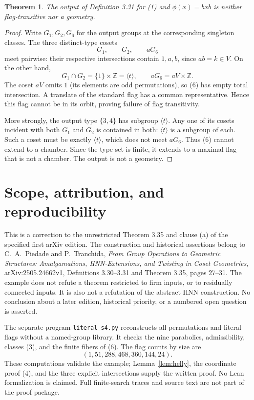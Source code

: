 \documentclass[11pt,a4paper]{article}
\newtheorem{theorem}{Theorem}
\newcommand{\gen}[1]{\langle #1\rangle}
\begin{document}
\begin{theorem}
The output of Definition 3.31 for (1) and $\phi(x)=bxb$ is neither
flag-transitive nor a geometry.
\end{theorem}
\begin{proof}
Write $G_1,G_2,G_6$ for the output groups at the corresponding singleton
classes. The three distinct-type cosets
\[
 G_1,\qquad G_2,\qquad aG_6                              \tag{6}
\]
meet pairwise: their respective intersections contain $1,a,b$, since
$ab=k\in V$. On the other hand,
\[
 G_1\cap G_2=\{1\}\times\mathbb Z=\gen t,
 \qquad aG_6=aV\times\mathbb Z.
\]
The coset $aV$ omits $1$ (its elements are odd permutations), so (6)
has empty total intersection. A translate of the standard flag has a
common representative. Hence this flag cannot be in its orbit, proving
failure of flag transitivity.

More strongly, the output type $\{3,4\}$ has subgroup $\gen t$.
Any one of its cosets incident with both $G_1$ and $G_2$ is contained
in both: $\gen t$ is a subgroup of each. Such a coset must be exactly
$\gen t$, which does not meet $aG_6$. Thus (6) cannot extend to a
chamber. Since the type set is finite, it extends to a maximal flag
that is not a chamber. The output is not a geometry.
\end{proof}

\section{Scope, attribution, and reproducibility}
This is a correction to the unrestricted Theorem 3.35 and clause (a) of
the specified first arXiv edition. The construction and historical
assertions belong to C.~A.~Piedade and P.~Tranchida, \emph{From Group
Operations to Geometric Structures: Amalgamations, HNN-Extensions, and
Twisting in Coset Geometries}, arXiv:2505.24662v1, Definitions 3.30--3.31
and Theorem 3.35, pages 27--31. The example does not refute a theorem
restricted to firm inputs, or to residually connected inputs. It is
also not a refutation of the abstract HNN construction. No conclusion
about a later edition, historical priority, or a numbered open question
is asserted.

The separate program \texttt{literal\_s4.py} reconstructs all permutations
and literal flags without a named-group library. It checks the nine
parabolics, admissibility, classes (3), and the finite fibers of (6).
The flag counts by size are
\[
 (1,51,288,468,360,144,24).
\]
These computations validate the example; Lemma~\ref{lem:helly}, the
coordinate proof (4), and the three explicit intersections supply the
written proof. No Lean formalization is claimed. Full finite-search
traces and source text are not part of the proof package.
\end{document}
